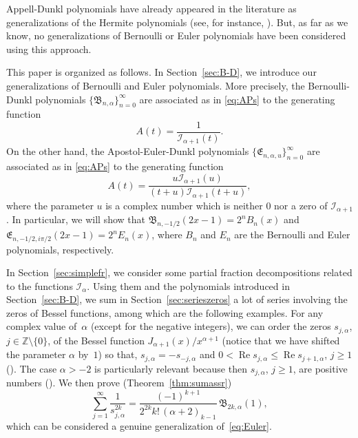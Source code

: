 \documentclass[10pt,a4paper]{article}
\theoremstyle{plain}
\theoremstyle{definition}
\numberwithin{equation}{section} %
\newcommand{\I}{\mathcal{I}}
\newcommand{\B}{\mathfrak{B}}
\newcommand{\E}{\mathfrak{E}}
\newcommand{\ZZ}{\mathbb{Z}}
\renewcommand{\Re}{\operatorname{Re}}
\begin{document}
Appell-Dunkl polynomials have already appeared in the literature as generalizations of the Hermite polynomials (see, for instance, \cite{AlS, Ros}).
But, as far as we know, no generalizations of Bernoulli or Euler polynomials have been considered using this approach.

This paper is organized as follows. In Section~\ref{sec:B-D}, we introduce our generalizations of Bernoulli and Euler polynomials.
More precisely, the Bernoulli-Dunkl polynomials $\{\B_{n,\alpha}\}_{n=0}^{\infty}$ are associated as in \eqref{eq:APs} to the generating function
\[
  A(t) = \frac{1}{\I_{\alpha+1}(t)}.
\]
On the other hand, the Apostol-Euler-Dunkl polynomials $\{\E_{n,\alpha,u}\}_{n=0}^{\infty}$ are associated as in \eqref{eq:APs} to the generating function
\[
  A(t) = \frac{u\I_{\alpha+1}(u)}{(t+u)\I_{\alpha+1}(t+u)},
\]
where the parameter $u$ is a complex number which is neither $0$ nor a zero of $\I_{\alpha+1}$.
In particular, we will show that $\B_{n,-1/2}(2x-1) = 2^nB_n(x)$ and $\E_{n,-1/2,i\pi/2}(2x-1) = 2^nE_n(x)$, where $B_n$ and $E_n$ are the Bernoulli and Euler polynomials, respectively.

In Section~\ref{sec:simplefr}, we consider some partial fraction decompositions related to the functions $\I_\alpha$. Using them and the polynomials introduced in Section~\ref{sec:B-D}, we sum in Section~\ref{sec:serieszeros} a lot of series involving the zeros of Bessel functions, among which are the following examples. For any complex value of~$\alpha$ (except for the negative integers), we can order the zeros $s_{j,\alpha}$, $j\in \ZZ \setminus\{0\}$, of the Bessel function $J_{\alpha+1}(x)/x^{\alpha+1}$ (notice that we have shifted the parameter $\alpha$ by~$1$) so that, $s_{j,\alpha} = -s_{-j,\alpha}$ and $0<\Re s_{j,\alpha}\le \Re s_{j+1,\alpha}$, $j\ge 1$ (\cite[\S\,15.41, p.~497]{Wat}).
The case $\alpha>-2$ is particularly relevant because then $s_{j,\alpha}$, $j\ge 1$, are positive numbers (\cite[\S\,15.27, p.~483]{Wat}). We then prove (Theorem~\ref{thm:sumassr})
\begin{equation}
\label{eq:sum1}
  \sum_{j=1}^\infty \frac{1}{s_{j,\alpha}^{2k}}
  = \frac{(-1)^{k+1}}{2^{2k}k!\,(\alpha+2)_{k-1}} \,\B_{2k,\alpha}(1),
\end{equation}
which can be considered a genuine generalization of~\eqref{eq:Euler}.
\end{document}
